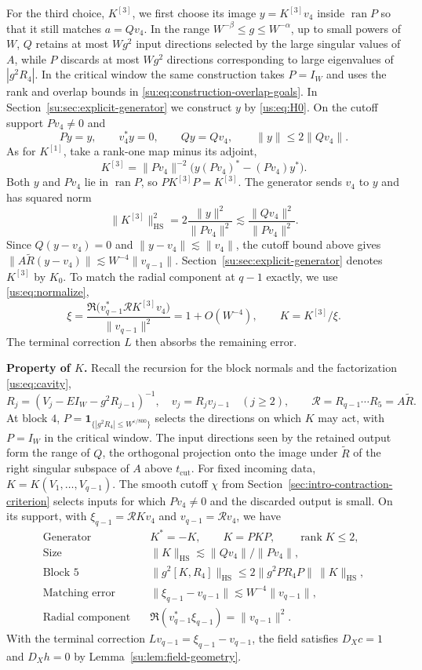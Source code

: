 \documentclass[11pt]{article}
\numberwithin{equation}{section}
\theoremstyle{remark}
\newcommand{\rank}{\operatorname{rank}}
\newcommand{\ran}{\operatorname{ran}}
\newcommand{\HS}{\mathrm{HS}}
\begin{document}
For the third choice, $K^{[3]}$, we first choose its image
$y=K^{[3]}v_4$ inside $\ran P$ so that it still matches $a=Qv_4$.
In the range $W^{-\beta}\le g\le W^{-\alpha}$, up to small powers of
$W$, $Q$ retains at most $Wg^2$ input directions selected by the large
singular values of $A$, while $P$ discards at most $Wg^2$ directions
corresponding to large eigenvalues of $|g^2R_4|$. In the critical
window the same construction takes $P=I_W$ and uses the rank and
overlap bounds in \eqref{su:eq:construction-overlap-goals}.
In Section~\ref{su:sec:explicit-generator}
we construct $y$ by \eqref{us:eq:H0}. On the cutoff support $Pv_4\ne0$ and
\[
 Py=y,\qquad v_4^*y=0,\qquad Qy=Qv_4,\qquad \|y\|\le2\|Qv_4\|.
\]
As for $K^{[1]}$, take a rank-one map minus its adjoint,
\[
 K^{[3]}=\|Pv_4\|^{-2}
       \bigl(y(Pv_4)^*-(Pv_4)y^*\bigr).
\]
Both $y$ and $Pv_4$ lie in $\ran P$, so $PK^{[3]}P=K^{[3]}$.
The generator sends $v_4$ to $y$ and has squared norm
\[
 \|K^{[3]}\|_{\HS}^2
 =2\frac{\|y\|^2}{\|Pv_4\|^2}
 \lesssim\frac{\|Qv_4\|^2}{\|Pv_4\|^2}.
\]
Since $Q(y-v_4)=0$ and $\|y-v_4\|\lesssim\|v_4\|$, the cutoff bound
above gives $\|A\widetilde R(y-v_4)\|\lesssim W^{-4}\|v_{q-1}\|$.
Section~\ref{su:sec:explicit-generator} denotes $K^{[3]}$ by $K_0$.
To match the radial component at $q-1$ exactly, we use
\eqref{us:eq:normalize},
\[
 \xi=\frac{\Re\bigl(v_{q-1}^*\mathcal R K^{[3]}v_4\bigr)}
               {\|v_{q-1}\|^2}=1+O(W^{-4}),\qquad K=K^{[3]}/\xi .
\]
The terminal correction $L$ then absorbs the remaining error.

\textbf{Property of $K$.}
Recall the recursion for the block normals and the factorization
\eqref{us:eq:cavity},
\[
 R_j=(V_j-EI_W-g^2R_{j-1})^{-1},\quad v_j=R_jv_{j-1}\quad(j\ge2),
 \qquad \mathcal R=R_{q-1}\cdots R_5=A\widetilde R.
\]
At block $4$, $P=\mathbf1_{\{|g^2R_4|\le W^{\varepsilon/800}\}}$
selects the directions on which $K$ may act, with $P=I_W$ in the
critical window. The input directions seen by the retained output form
the range of $Q$, the orthogonal projection onto the image under
$\widetilde R$ of the right singular subspace of $A$ above $t_{\mathrm{cut}}$.
For fixed incoming data, $K=K(V_1,\ldots,V_{q-1})$. The smooth cutoff
$\chi$ from Section~\ref{sec:intro-contraction-criterion} selects inputs
for which $Pv_4\ne0$ and the discarded output is small. On its support,
with $\xi_{q-1}=\mathcal R Kv_4$ and $v_{q-1}=\mathcal Rv_4$, we have
\[
 \begin{aligned}
 \text{Generator}\quad & K^*=-K,\qquad K=PKP,\qquad \rank K\le2,\\
 \text{Size}\quad & \|K\|_{\HS}\lesssim \|Qv_4\|/\|Pv_4\|,\\
 \text{Block }5\quad & \|g^2[K,R_4]\|_{\HS}
     \le 2\|g^2PR_4P\|\,\|K\|_{\HS},\\
 \text{Matching error}\quad & \|\xi_{q-1}-v_{q-1}\|
     \lesssim W^{-4}\|v_{q-1}\|,\\
 \text{Radial component}\quad & \Re(v_{q-1}^*\xi_{q-1})=\|v_{q-1}\|^2.
 \end{aligned}
\]
With the terminal correction $Lv_{q-1}=\xi_{q-1}-v_{q-1}$, the field
satisfies $D_Xc=1$ and $D_Xh=0$ by Lemma~\ref{su:lem:field-geometry}.
\end{document}
